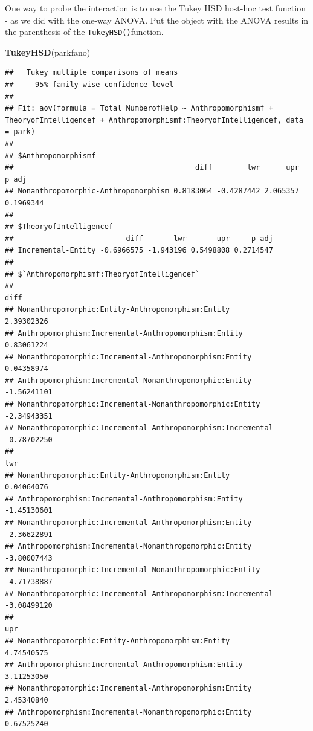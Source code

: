 \documentclass[
]{book}
\newenvironment{Shaded}{\begin{snugshade}}{\end{snugshade}}
\newcommand{\KeywordTok}[1]{\textcolor[rgb]{0.13,0.29,0.53}{\textbf{#1}}}
\newcommand{\NormalTok}[1]{#1}
\begin{document}
One way to probe the interaction is to use the Tukey HSD host-hoc test function - as we did with the one-way ANOVA. Put the object with the ANOVA results in the parenthesis of the \texttt{TukeyHSD()}function.

\begin{Shaded}
\begin{Highlighting}[]
\KeywordTok{TukeyHSD}\NormalTok{(parkfano)}
\end{Highlighting}
\end{Shaded}

\begin{verbatim}
##   Tukey multiple comparisons of means
##     95% family-wise confidence level
## 
## Fit: aov(formula = Total_NumberofHelp ~ Anthropomorphismf + TheoryofIntelligencef + Anthropomorphismf:TheoryofIntelligencef, data = park)
## 
## $Anthropomorphismf
##                                          diff        lwr      upr     p adj
## Nonanthropomorphic-Anthropomorphism 0.8183064 -0.4287442 2.065357 0.1969344
## 
## $TheoryofIntelligencef
##                          diff       lwr       upr     p adj
## Incremental-Entity -0.6966575 -1.943196 0.5498808 0.2714547
## 
## $`Anthropomorphismf:TheoryofIntelligencef`
##                                                                    diff
## Nonanthropomorphic:Entity-Anthropomorphism:Entity            2.39302326
## Anthropomorphism:Incremental-Anthropomorphism:Entity         0.83061224
## Nonanthropomorphic:Incremental-Anthropomorphism:Entity       0.04358974
## Anthropomorphism:Incremental-Nonanthropomorphic:Entity      -1.56241101
## Nonanthropomorphic:Incremental-Nonanthropomorphic:Entity    -2.34943351
## Nonanthropomorphic:Incremental-Anthropomorphism:Incremental -0.78702250
##                                                                     lwr
## Nonanthropomorphic:Entity-Anthropomorphism:Entity            0.04064076
## Anthropomorphism:Incremental-Anthropomorphism:Entity        -1.45130601
## Nonanthropomorphic:Incremental-Anthropomorphism:Entity      -2.36622891
## Anthropomorphism:Incremental-Nonanthropomorphic:Entity      -3.80007443
## Nonanthropomorphic:Incremental-Nonanthropomorphic:Entity    -4.71738887
## Nonanthropomorphic:Incremental-Anthropomorphism:Incremental -3.08499120
##                                                                    upr
## Nonanthropomorphic:Entity-Anthropomorphism:Entity           4.74540575
## Anthropomorphism:Incremental-Anthropomorphism:Entity        3.11253050
## Nonanthropomorphic:Incremental-Anthropomorphism:Entity      2.45340840
## Anthropomorphism:Incremental-Nonanthropomorphic:Entity      0.67525240

\end{verbatim}
\end{document}
